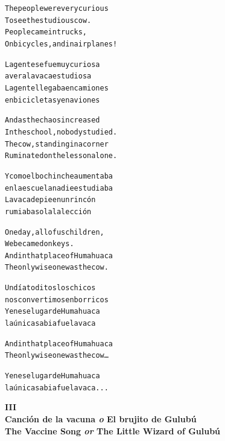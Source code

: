 \documentclass[11pt]{article}
\begin{document}
\begin{parcolumns}{2}
\colchunk
{
\begin{alltt}\normalfont
The people were very curious
To see the studious cow.
People came in trucks,
On bicycles, and in airplanes!
\end{alltt}
}

\colchunk
{
\begin{alltt}\normalfont
La gente se fue muy curiosa
a ver a la vaca estudiosa
La gente llegaba en camiones
en bicicletas y en aviones
\end{alltt}
}

\colplacechunks

\colchunk
{
\begin{alltt}\normalfont
And as the chaos increased
In the school, nobody studied.
The cow, standing in a corner
Ruminated on the lesson alone.
\end{alltt}
}

\colchunk
{
\begin{alltt}\normalfont
Y como el bochinche aumentaba
en la escuela nadie estudiaba
La vaca de pie en un rincón
rumiaba sola la lección
\end{alltt}
}

\colplacechunks

\colchunk
{
\begin{alltt}\normalfont
One day, all of us children,
We became donkeys.
And in that place of Humahuaca
The only wise one was the cow.
\end{alltt}
}

\colchunk
{
\begin{alltt}\normalfont
Un día toditos los chicos
nos convertimos en borricos
Y en ese lugar de Humahuaca
la única sabia fue la vaca
\end{alltt}
}

\colplacechunks

\colchunk
{
\begin{alltt}\normalfont
And in that place of Humahuaca
The only wise one was the cow…
\end{alltt}
}

\colchunk
{
\begin{alltt}\normalfont
Y en ese lugar de Humahuaca
la única sabia fue la vaca...
\end{alltt}
}

\colplacechunks

\end{parcolumns}

\clearpage

\begin{center}
\large\textbf{
III\\
Canción de la vacuna \emph{o} El brujito de Gulubú\\
The Vaccine Song \emph{or} The Little Wizard of Gulubú
}
\end{center}
\end{document}
